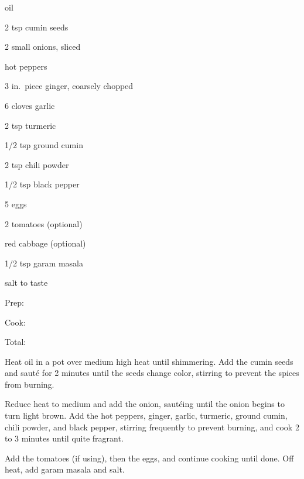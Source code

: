\documentclass[oneside]{book}  %
\newcommand{\itemNL}{\item[] \hspace{-\labelsep}}  %
\begin{document}
\begin{IT}
  \begin{ingredients}
    \itemNL oil
    \item[2 tsp] cumin seeds
    \item[2 small] onions, sliced
    \itemNL hot peppers
    \item[3 in.\ piece] ginger, coarsely chopped
    \item[6 cloves] garlic
    \item[2 tsp] turmeric
    \item[1/2 tsp] ground cumin
    \item[2 tsp] chili powder
    \item[1/2 tsp] black pepper
    \item[5] eggs
    \item[2] tomatoes (optional)
    \itemNL red cabbage (optional)
    \item[1/2 tsp] garam masala
    \itemNL salt to taste
  \end{ingredients}

  \switchcolumn

  \begin{timeline}
    \item[Prep:]  \todo
    \item[Cook:]  \todo
    \item[Total:] \todo
  \end{timeline}
\end{IT}

\begin{directions}
  \item Heat oil in a pot over medium high heat until shimmering. Add the cumin
  seeds and saut\'e for 2 minutes until the seeds change color, stirring to
  prevent the spices from burning.

  \item Reduce heat to medium and add the onion, saut\'eing until the onion
  begins to turn light brown. Add the hot peppers, ginger, garlic, turmeric,
  ground cumin, chili powder, and black pepper, stirring frequently to prevent
  burning, and cook 2 to 3 minutes until quite fragrant.

  \item Add the tomatoes (if using), then the eggs,  and continue cooking until
  done. Off heat, add garam masala and salt.
\end{directions}
\end{document}
